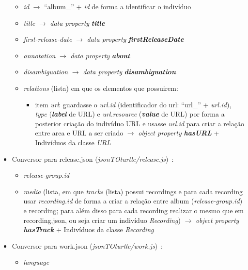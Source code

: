 \documentclass{article}
\begin{document}
\begin{itemize}
        \begin{itemize}
            \item \textit{id} $\to$ ``album\_'' + \textit{id} de forma a identificar o indivíduo
            \item \textit{title} $\to$ \textit{data property} \textit{\textbf{title}}
            \item \textit{first-release-date} $\to$ \textit{data property} \textit{\textbf{firstReleaseDate}}
            \item \textit{annotation} $\to$ \textit{data property} \textit{\textbf{about}}
            \item \textit{disambiguation} $\to$ \textit{data property} \textit{\textbf{disambiguation}}
            \item \textit{relations} (lista) em que os elementos que possuirem:
                \begin{itemize}
                    \item item \textit{url}: guardasse o \textit{url.id} (identificador do url: ``url\_'' + \textit{url.id}), \textit{type} (\textit{\textbf{label}} de URL) e \textit{url.resource} (\textit{\textbf{value}} de URL) por forma a posterior criação do indivíduo URL e usasse \textit{url.id} para criar a relação entre area e URL a ser criado $\to$ \textit{object property} \textit{\textbf{hasURL}} + Indivíduos da classe \textit{URL}
                \end{itemize}
        \end{itemize}
    \item Conversor para release.json (\textit{jsonTOturtle/release.js})~\cite{mbRe}:
        \begin{itemize}
            \item \textit{release-group.id}
            \item \textit{media} (lista, em que \textit{tracks} (lista) possui recordings e para cada recording usar \textit{recording.id} de forma a criar a relação entre album (\textit{release-group.id}) e recording; para além disso para cada recording realizar o mesmo que em recording.json, ou seja criar um indivíduo \textit{Recording}) $\to$ \textit{object property} \textit{\textbf{hasTrack}} + Indivíduos da classe \textit{Recording}
        \end{itemize}
    \item Conversor para work.json (\textit{jsonTOturtle/work.js})~\cite{mbWo}:
        \begin{itemize}
            \item \textit{language}

\end{itemize}
\end{itemize}
\end{document}

